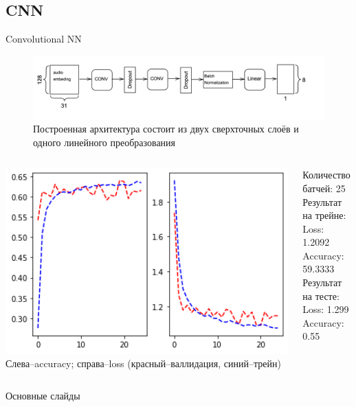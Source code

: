 \documentclass[c, aspectratio = 43]{beamer}
\begin{document}
\subsection{CNN}

    \begin{frame}{Convolutional NN}
        \begin{figure}[h]
            \includegraphics[width=1\linewidth]{CNN.png}
            Построенная архитектура состоит из двух сверхточных слоёв и одного линейного преобразования
        \end{figure}

        \begin{columns}
            \begin{column}{0.5\textwidth}  %
                \begin{center}
                    \includegraphics[width=1\textwidth]{CNN_testandval.png}
                    \tiny Слева--accuracy; справа--loss (красный--валлидация, синий--трейн)
                \end{center}
            \end{column}
            \begin{column}{0.5\textwidth}
                Количество батчей: 25\\

                Результат на трейне:\\
                Loss: 1.2092\\
                Accuracy: 59.3333\\

                Результат на тесте:\\
                Loss: 1.299\\
                Accuracy: 0.55\\
            \end{column}

        \end{columns}


    \end{frame}



\beamertemplatenavigationsymbolsempty
\begin{frame}[noframenumbering]{Основные слайды}
	\hypertarget{toc}{}
	\tableofcontents[part=1]
\end{frame}
\end{document}
